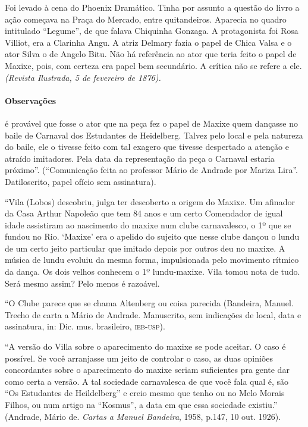 Foi levado à cena do Phoenix Dramático. Tinha por assunto a questão do
livro a ação começava na Praça do Mercado, entre quitandeiros. Aparecia
no quadro intitulado ``Legume'', de que falava Chiquinha Gonzaga. A
protagonista foi Rosa Villiot, era a Clarinha Angu. A atriz Delmary
fazia o papel de Chica Valsa e o ator Silva o de Angelo Bitu. Não há
referência ao ator que teria feito o papel de Maxixe, pois, com certeza
era papel bem secundário. A crítica não se refere a ele. \emph{(Revista
Ilustrada, 5 de fevereiro de 1876).}

\paragraph{Observações} é provável que fosse o ator que na peça fez o papel de
Maxixe quem dançasse no baile de Carnaval dos Estudantes de Heidelberg.
Talvez pelo local e pela natureza do baile, ele o tivesse feito com tal
exagero que tivesse despertado a atenção e atraído imitadores. Pela data
da representação da peça o Carnaval estaria próximo''. (``Comunicação
feita ao professor Mário de Andrade por Mariza Lira''. Datiloscrito,
papel ofício sem assinatura).

``Vila (Lobos) descobriu, julga ter descoberto a origem do Maxixe. Um
afinador da Casa Arthur Napoleão que tem 84 anos e um certo Comendador
de igual idade assistiram ao nascimento do maxixe num clube
carnavalesco, o 1º que se fundou no Rio. `Maxixe' era o apelido do
sujeito que nesse clube dançou o lundu de um certo jeito particular que
imitado depois por outros deu no maxixe. A música de lundu evoluiu da
mesma forma, impulsionada pelo movimento rítmico da dança. Os dois
velhos conhecem o 1º lundu-maxixe. Vila tomou nota de tudo. Será mesmo
assim? Pelo menos é razoável.

``O Clube parece que se chama Altenberg ou coisa parecida (Bandeira,
Manuel. Trecho de carta a Mário de Andrade. Manuscrito, sem indicações
de local, data e assinatura, in: Dic. mus. brasileiro, \textsc{ieb-usp}).

``A versão do Villa sobre o aparecimento do maxixe se pode aceitar. O
caso é possível. Se você arranjasse um jeito de controlar o caso, as
duas opiniões concordantes sobre o aparecimento do maxixe seriam
suficientes pra gente dar como certa a versão. A tal sociedade
carnavalesca de que você fala qual é, são ``Os Estudantes de Heildelberg''
e creio mesmo que tenho ou no Melo Morais Filhos, ou num artigo na
``Kosmus'', a data em que essa sociedade existiu.'' (Andrade, Mário de.
\emph{Cartas a Manuel Bandeira}, 1958, p.147, 10 out. 1926).

